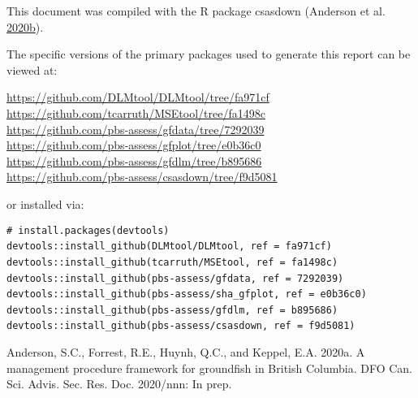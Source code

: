 \documentclass[11pt]{book}
\begin{document}
This document was compiled with the R package csasdown (Anderson et al. \protect\hyperlink{ref-csasdown}{2020}\protect\hyperlink{ref-csasdown}{b}).

The specific versions of the primary packages used to generate this report can be viewed at:

\url{https://github.com/DLMtool/DLMtool/tree/fa971cf}\\
\url{https://github.com/tcarruth/MSEtool/tree/fa1498c}~\\
\url{https://github.com/pbs-assess/gfdata/tree/7292039}~\\
\url{https://github.com/pbs-assess/gfplot/tree/e0b36c0}~\\
\url{https://github.com/pbs-assess/gfdlm/tree/b895686}~\\
\url{https://github.com/pbs-assess/csasdown/tree/f9d5081}~\\

\vspace{4mm}

or installed via:

\texttt{\#\ install.packages(\textquotesingle{}devtools\textquotesingle{})}\\
\texttt{devtools::install\_github(\textquotesingle{}DLMtool/DLMtool\textquotesingle{},\ ref\ =\ \textquotesingle{}fa971cf\textquotesingle{})}~\\
\texttt{devtools::install\_github(\textquotesingle{}tcarruth/MSEtool\textquotesingle{},\ ref\ =\ \textquotesingle{}fa1498c\textquotesingle{})}~\\
\texttt{devtools::install\_github(\textquotesingle{}pbs-assess/gfdata\textquotesingle{},\ ref\ =\ \textquotesingle{}7292039\textquotesingle{})}~\\
\texttt{devtools::install\_github(\textquotesingle{}pbs-assess/sha\_gfplot\textquotesingle{},\ ref\ =\ \textquotesingle{}e0b36c0\textquotesingle{})}~\\
\texttt{devtools::install\_github(\textquotesingle{}pbs-assess/gfdlm\textquotesingle{},\ ref\ =\ \textquotesingle{}b895686\textquotesingle{})}~\\
\texttt{devtools::install\_github(\textquotesingle{}pbs-assess/csasdown\textquotesingle{},\ ref\ =\ \textquotesingle{}f9d5081\textquotesingle{})}~\\

\clearpage

\hypertarget{refs}{}
\leavevmode\hypertarget{ref-anderson2020gfmp}{}%
Anderson, S.C., Forrest, R.E., Huynh, Q.C., and Keppel, E.A. 2020a. A management procedure framework for groundfish in British Columbia. DFO Can. Sci. Advis. Sec. Res. Doc. 2020/nnn: In prep.
\end{document}

